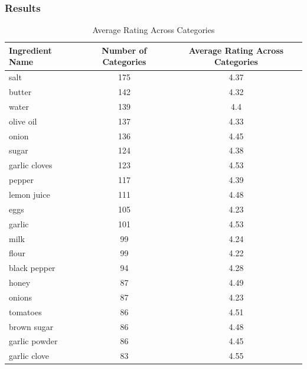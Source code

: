 \begin{enumerate}
    \subsubsection{Results}
    \begin{table}[h!]
\small %
\centering
\begin{tabularx}{\textwidth}{>{\raggedright\arraybackslash}Xcc}
\toprule
\textbf{Ingredient Name} & \textbf{Number of Categories} & \textbf{Average Rating Across Categories} \\
\midrule
salt & 175 & 4.37 \\
butter & 142 & 4.32 \\
water & 139 & 4.4 \\
olive oil & 137 & 4.33 \\
onion & 136 & 4.45 \\
sugar & 124 & 4.38 \\
garlic cloves & 123 & 4.53 \\
pepper & 117 & 4.39 \\
lemon juice & 111 & 4.48 \\
eggs & 105 & 4.23 \\
garlic & 101 & 4.53 \\
milk & 99 & 4.24 \\
flour & 99 & 4.22 \\
black pepper & 94 & 4.28 \\
honey & 87 & 4.49 \\
onions & 87 & 4.23 \\
tomatoes & 86 & 4.51 \\
brown sugar & 86 & 4.48 \\
garlic powder & 86 & 4.45 \\
garlic clove & 83 & 4.55 \\
\bottomrule
\end{tabularx}
\caption{Average Rating Across Categories}
\label{tab:ingredient_ratings}
\end{table}


\end{enumerate}
